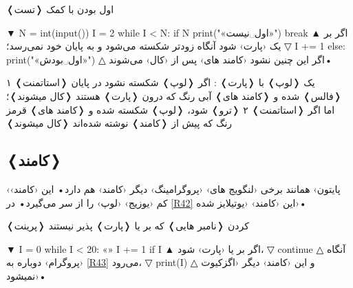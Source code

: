 \documentclass[openany, twocolumn]{book}
\begin{document}
\begin{Program}
\caption{❬تست❭ اول بودن با کمک \label{R39 =000628=000627 else}}

▼
N = int(input())
I = 2
while I < N:
	if N %
		print("«اول␣نیست»")
		break
▲
 اگر  بر یک  ‹پارت› شود آنگاه  زود‌تر شکسته می‌شود و به پایان خود نمی‌رسد؛ 
▽
	I += 1
else:
	print("«اول␣بودش»")
△
 اگر این چنین نشود ‹کامند های› پس از  ‹کال› می‌شوند•
\end{Program}

\begin{Figure*}

\caption{یک ❬لوپ❭ با ❬پارت❭ : اگر ❬لوپ❭ شکسته نشود در پایان ❬استاتمنت❭ ۱ ❬فالس❭ شده و ❬کامند های❭ آبی رنگ که درون ❬پارت❭  هستند ❬کال میشوند❭؛ اما اگر ❬استاتمنت❭ ۲ ❬ترو❭ شود، ❬لوپ❭ شکسته شده و ❬کامند های❭ قرمز رنگ که پیش از ❬کامند❭  نوشته شده‌اند ❬کال میشوند❭\label{R38 =000648 else}}
\end{Figure*}

\subsection{❬کامند❭ }
‹پایتون› همانند برخی ‹لنگویج های› ‹پروگرامینگ› دیگر ‹کامند›  هم دارد• این ‹کامند› کم ‹یوزیج› ‹لوپ›  را از سر می‌گیرد• در \ref{R42} این ‹کامند› ‹یوتیلایز شده›•

\begin{Program}
\caption{❬پرینت❭ کردن ❬نامبر هایی❭ که بر  یا  ❬پارت❭ پذیر نیستند\label{R42}}

▼
I = 0
while I < 20: «\label{R43}»
	I += 1
	if I %
▲
 اگر  بر  یا  ‹پارت› شود، 
▽
		continue
△
 آنگاه ‹پروگرام› دو‌باره به \ref{R43} می‌رود، 
▽
	print(I)
△
 و این ‹کامند›  دیگر ‹اگزکیوت نمیشود›•
\end{Program}
\end{document}
